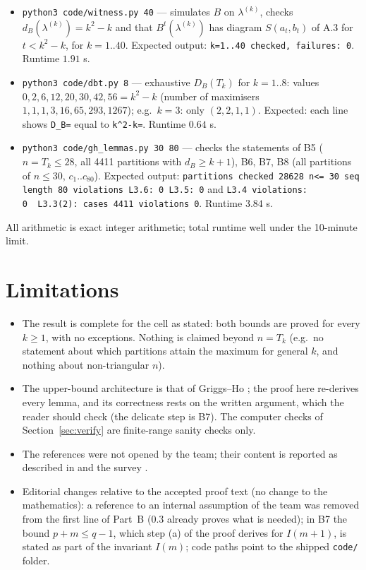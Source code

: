 \documentclass[11pt]{article}
\newcommand{\DB}{D_B}
\newcommand{\dB}{d_B}
\begin{document}
\begin{itemize}
\item \texttt{python3 code/witness.py 40} --- simulates $B$ on $\lambda^{(k)}$, checks $\dB(\lambda^{(k)})=k^2-k$ and that $B^t(\lambda^{(k)})$ has diagram $S(a_t,b_t)$ of A.3 for $t<k^2-k$, for $k=1..40$. Expected output: \texttt{k=1..40 checked, failures: 0}. Runtime $1.91$ s.
\item \texttt{python3 code/dbt.py 8} --- exhaustive $\DB(T_k)$ for $k=1..8$: values $0,2,6,12,20,30,42,56=k^2-k$ (number of maximisers $1,1,1,3,16,65,293,1267$); e.g.\ $k=3$: only $(2,2,1,1)$. Expected: each line shows \texttt{D\_B=} equal to \texttt{k\^{}2-k=}. Runtime $0.64$ s.
\item \texttt{python3 code/gh\_lemmas.py 30 80} --- checks the statements of B5 ($n=T_k\le28$, all 4411 partitions with $\dB\ge k+1$), B6, B7, B8 (all partitions of $n\le30$, $c_1..c_{80}$). Expected output:
\texttt{partitions checked 28628 n<= 30 seq length 80 violations L3.6: 0 L3.5: 0} and
\texttt{L3.4 violations: 0\ \ L3.3(2): cases 4411 violations 0}. Runtime $3.84$ s.
\end{itemize}
All arithmetic is exact integer arithmetic; total runtime well under the 10-minute limit.

\section{Limitations}

\begin{itemize}
\item The result is complete for the cell as stated: both bounds are proved for every $k\ge1$, with no exceptions. Nothing is claimed beyond $n=T_k$ (e.g.\ no statement about which partitions attain the maximum for general $k$, and nothing about non-triangular $n$).
\item The upper-bound architecture is that of Griggs--Ho \cite{GH}; the proof here re-derives every lemma, and its correctness rests on the written argument, which the reader should check (the delicate step is B7). The computer checks of Section~\ref{sec:verify} are finite-range sanity checks only.
\item The references \cite{Igusa,Etienne,Bentz} were not opened by the team; their content is reported as described in \cite{GH} and the survey \cite{Mestrovic}.
\item Editorial changes relative to the accepted proof text (no change to the mathematics): a reference to an internal assumption of the team was removed from the first line of Part~B (0.3 already proves what is needed); in B7 the bound $p+m\le q-1$, which step (a) of the proof derives for $I(m+1)$, is stated as part of the invariant $I(m)$; code paths point to the shipped \texttt{code/} folder.
\end{itemize}
\end{document}
